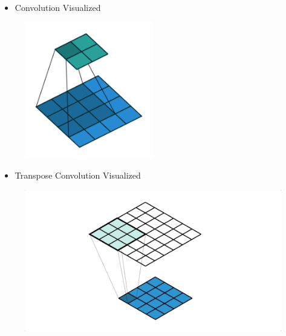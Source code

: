 \documentclass{beamer}
\begin{document}
\begin{frame}[allowframebreaks]

\begin{itemize}
    \item Convolution Visualized
\end{itemize}

\begin{figure}[H]
    \centering
    \includegraphics[width=0.5\textwidth]{.././assets/8.15.gif}
\end{figure}

\begin{itemize}
    \item Transpose Convolution Visualized
\end{itemize}

\begin{figure}[H]
    \centering
    \includegraphics[width=1.0\textwidth]{.././assets/8.16.gif}
\end{figure}

\end{frame}
\end{document}
